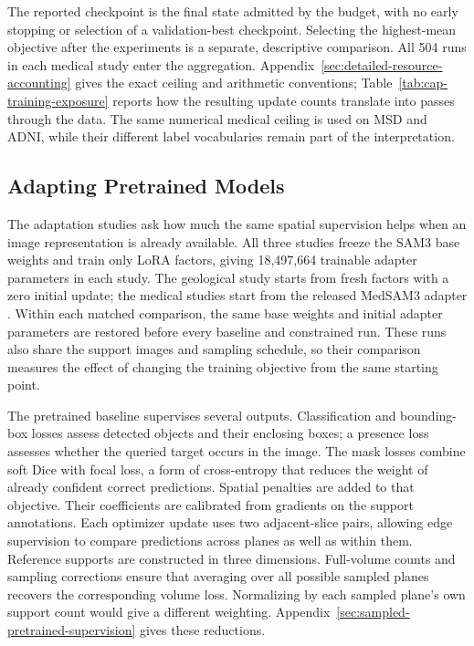 The reported checkpoint is the final state admitted by the budget, with
no early stopping or selection of a validation-best checkpoint. Selecting
the highest-mean objective after the experiments is a separate, descriptive
comparison. All 504 runs in each medical study enter the aggregation.
Appendix~\ref{sec:detailed-resource-accounting} gives the exact ceiling
and arithmetic conventions; Table~\ref{tab:cap-training-exposure} reports
how the resulting update counts translate into passes through the data.
The same numerical medical ceiling is used on MSD and ADNI, while their
different label vocabularies remain part of the interpretation.

\subsection{Adapting Pretrained Models}

The adaptation studies ask how much the same spatial supervision helps
when an image representation is already available. All three studies
freeze the SAM3 base weights and train only LoRA factors, giving
18,497,664 trainable adapter parameters in each study. The geological
study starts from fresh factors with a zero initial update; the medical
studies start from the released MedSAM3 adapter
\cite{carion2025sam3,liu2025medsam3}. Within each matched comparison, the
same base weights and initial adapter parameters are restored before
every baseline and constrained run. These runs also share the support
images and sampling schedule, so their comparison measures the effect
of changing the training objective from the same starting point.

The pretrained baseline supervises several outputs. Classification and
bounding-box losses assess detected objects and their enclosing boxes; a
presence loss assesses whether the queried target occurs in the image. The
mask losses combine soft Dice with focal loss, a form of cross-entropy that
reduces the weight of already confident correct predictions. Spatial
penalties are added to that objective. Their coefficients are calibrated
from gradients on the support annotations. Each optimizer update uses two
adjacent-slice pairs, allowing edge supervision to compare predictions
across planes as well as within them. Reference supports are constructed in
three dimensions. Full-volume counts and sampling corrections ensure that
averaging over all possible sampled planes recovers the corresponding volume
loss. Normalizing by each sampled plane's own support count would give a
different weighting. Appendix~\ref{sec:sampled-pretrained-supervision} gives
these reductions.

